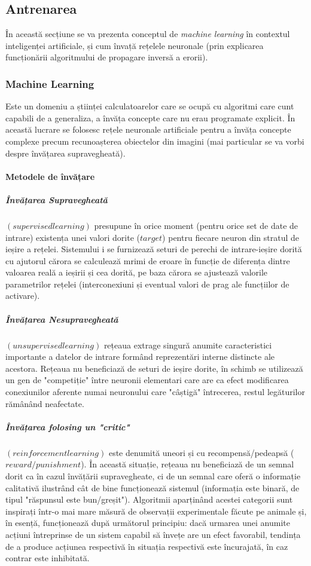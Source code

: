 \subsection{Antrenarea}
În această secțiune se va prezenta conceptul de \textit{machine learning} în contextul inteligenței artificiale, și cum învață rețelele neuronale (prin explicarea funcționării algoritmului de propagare inversă a erorii).\newline

\subsubsection{Machine Learning}
Este un domeniu a științei calculatoarelor care se ocupă cu algoritmi care cunt capabili de a generaliza, a învăța concepte care nu erau programate explicit. În această lucrare se folosesc rețele neuronale artificiale pentru a învăța concepte complexe precum recunoașterea obiectelor din imagini (mai particular se va vorbi despre învățarea supravegheată).

\paragraph{Metodele de învățare}


\subparagraph{Învățarea Supravegheată} $(supervised learning)$ presupune în orice moment (pentru orice set de date de intrare) existența unei valori dorite ($target$) pentru fiecare neuron din stratul de ieșire a rețelei. Sistemului i se furnizează seturi de perechi de intrare-ieșire dorită cu ajutorul cărora se calculează mrimi de eroare în funcție de diferența dintre valoarea reală a ieșirii și cea dorită, pe baza cărora se ajustează valorile parametrilor rețelei (interconexiuni și eventual valori de prag ale funcțiilor de activare). 


\subparagraph{Învățarea Nesupravegheată} $(unsupervised learning)$ rețeaua extrage singură anumite caracteristici importante a datelor de intrare formând reprezentări interne distincte ale acestora. Rețeaua nu beneficiază de seturi de ieșire dorite, în schimb se utilizează un gen de "competiție" între neuronii elementari care are ca efect modificarea conexiunilor aferente numai neuronului care "câștigă" întrecerea, restul legăturilor rămânând neafectate.


\subparagraph{Învățarea folosing un "critic"} $(reinforcement learning)$  este denumită uneori și cu recompensă/pedeapsă ($reward/punishment$). În această situație, rețeaua nu beneficiază de un semnal dorit ca în cazul învățării supravegheate, ci de un semnal care oferă o informație calitativă ilustrând cât de bine funcționează sistemul (informația este binară, de tipul "răspunsul este bun/greșit"). Algoritmii aparținând acestei categorii sunt inspirați într-o mai mare măsură de observații experimentale făcute pe animale și, în esență, funcționează după următorul principiu: dacă urmarea unei anumite acțiuni întreprinse de un sistem capabil să învețe are un efect favorabil, tendința de a produce acțiunea respectivă în situația respectivă este încurajată, în caz contrar este inhibitată.


